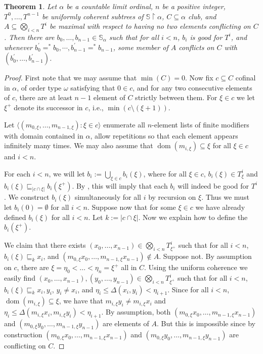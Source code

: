 \documentclass[a4paper,noamsfonts]{amsart}
\newtheorem{theorem}{Theorem}[section]
\theoremstyle{definition}
\newcommand{\seb}{\subseteq}
\newcommand{\setm}{\setminus}
\newcommand{\es}{\emptyset}
\newcommand{\tleq}{\sqsubseteq}
\newcommand{\res}{\!\upharpoonright\!}
\newcommand{\tup}[1]{\langle#1\rangle}
\newcommand{\1}{\mathbf{1}}
\renewcommand{\S}{\mathbb{S}}
\DeclareMathOperator{\dom}{dom}
\begin{document}
\begin{theorem}\label{lem:hard-ext}
  Let $\alpha$ be a countable limit ordinal,
  $n$ be a positive integer, $T^{0},\dots,T^{n-1}$ be uniformly coherent
  subtrees of $\S \res \alpha$, $C \seb \alpha$ club,
  and $A \seb \bigotimes_{i < n}T^{i}$ be maximal with respect
  to having no two elements conflicting on $C$. Then there are
  $b_{0},\dots,b_{n-1} \in \S_{\alpha}$ such that
  for all $i < n$, $b_{i}$ is good for $T^{i}$,
  and whenever
  $b^{'}_{0} =^{*} b_{0}, \cdots, b^{'}_{n-1} =^{*} b_{n-1}$, some member
  of $A$ conflicts on $C$ with
  $(b_{0}^{'},\dots,b_{n-1}^{'})$.
\end{theorem}
\begin{proof}
  First note that we may assume that $\min(C) = 0$.
  Now fix
  $c \seb C$ cofinal in $\alpha$, of order type $\omega$
  satisfying that $0 \in c$, and for any two consecutive elements of $c$,
  there are at least $n-1$ element of $C$ strictly between them.
  For $\xi \in c$
  we let $\xi^{+}$ denote its successor in $c$, i.e., $\min(c \setm (\xi +1))$.

  Let $\tup{(m_{0,\xi},\dots,m_{n-1,\xi}) : \xi \in c}$ enumerate all
  $n$-element lists
  of finite modifiers with domain contained in $\alpha$,
  allow repetitions so that each element
  appears infinitely many times. We may also assume that
  $\dom(m_{i,\xi}) \seb \xi$ for all $\xi \in c$ and $i < n$.

  For each $i < n$, we will let $b_{i} := \bigcup_{\xi \in c}b_{i}(\xi)$,
  where for all $\xi \in c$, $b_{i}(\xi) \in T^{i}_{\xi}$ and
  $b_{i}(\xi) \tleq_{|c \cap \xi|} b_{i}(\xi^{+})$. By ,
  this will imply that each $b_{i}$ will indeed be good for $T^{i}$.
  We construct
  $b_{i}(\xi)$ simultaneously for all $i$ by recursion on $\xi$.
  Thus we must let $b_{i}(0) = \es$ for all $i < n$. Suppose now that
  for some $\xi \in c$ we have already defined
  $b_{i}(\xi)$ for all $i < n$. Let $k := |c \cap \xi|$. Now we explain
  how to define the $b_{i}(\xi^{+})$.

  We claim that
  there exists
  $(x_{0},\dots,x_{n-1}) \in \bigotimes_{i <n}T^{i}_{\xi^{+}}$ such that
  for all $i <n$, $b_{i}(\xi) \tleq_{k} x_{i}$, and
  $(m_{0,\xi}x_{0},\dots,m_{n-1,\xi}x_{n-1}) \notin A$.
  Suppose not. By assumption on $c$,
  there are $\xi = \eta_{0} < \dots < \eta_{n} = \xi^{+}$ all in
  $C$.
  Using the uniform coherence we easily find
  $(x_{0},\dots,x_{n-1}),\allowbreak (y_{0},\dots,y_{n-1})
  \in \bigotimes_{i <n}T^{i}_{\xi^{+}}$ such that for all $i < n$,
  $b_{i}(\xi) \tleq_{k} x_{i},y_{i}$,
  $y_{i} \neq x_{i}$, and
  $\eta_{i} \le \Delta(x_{i},y_{i}) < \eta_{i+1}$.
  Since for all $i < n$, $\dom(m_{i,\xi}) \seb \xi$, we
  have that $m_{i,\xi}y_{i} \neq m_{i,\xi}x_{i}$ and
  $\eta_{i} \le \Delta(m_{i,\xi}x_{i},m_{i,\xi}y_{i}) < \eta_{i+1}$.
  By assumption, both
  $(m_{0,\xi}x_{0},\dots,m_{n-1,\xi}x_{n-1})$ and $(m_{0,\xi}y_{0},\dots,m_{n-1,\xi}y_{n-1})$
  are elements of $A$. But this is impossible since by construction
  $(m_{0,\xi}x_{0},\dots,m_{n-1,\xi}x_{n-1})$ and $(m_{0,\xi}y_{0},\dots,m_{n-1,\xi}y_{n-1})$
  are conflicting on $C$.
  

\end{proof}
\end{document}
